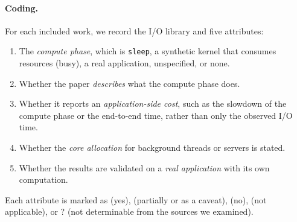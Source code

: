 \paragraph{Coding.} For each included work, we record the I/O library and
five attributes:
\begin{enumerate}
  \item The \emph{compute phase}, which is \texttt{sleep}, a synthetic kernel
        that consumes resources (busy), a real application, unspecified, or
        none.
  \item Whether the paper \emph{describes} what the compute phase does.
  \item Whether it reports an \emph{application-side cost}, such as the
        slowdown of the compute phase or the end-to-end time, rather than
        only the observed I/O time.
  \item Whether the \emph{core allocation} for background threads or servers
        is stated.
  \item Whether the results are validated on a \emph{real application} with
        its own computation.
\end{enumerate}
Each attribute is marked as \yes{} (yes), \partly{} (partially or as a
caveat), \no{} (no), \na{} (not applicable), or ? (not determinable from the
sources we examined).

